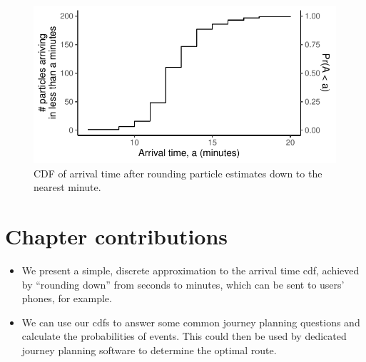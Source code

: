 \begin{knitrout}\small
{}\color{fgcolor}\begin{figure}

{\centering \includegraphics[width=.6\textwidth]{figure/eta_cdf-1} 

}

\caption[CDF of arrival time after rounding particle estimates down to the nearest minute]{CDF of arrival time after rounding particle estimates down to the nearest minute.}\label{fig:eta_cdf}
\end{figure}


\end{knitrout}






\section{Chapter contributions}
\label{sec:eta_contrib}

\begin{itemize}
\item We present a simple, discrete approximation to the arrival time \gls{cdf}, achieved by ``rounding down'' from seconds to minutes, which can be sent to users' phones, for example.

\item We can use our \pf{} \glspl{cdf} to answer some common journey planning questions and calculate the probabilities of events. This could then be used by dedicated journey planning software to determine the optimal route.
\end{itemize}
